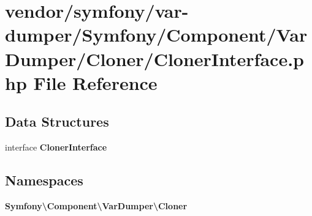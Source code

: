 \section{vendor/symfony/var-\/dumper/\+Symfony/\+Component/\+Var\+Dumper/\+Cloner/\+Cloner\+Interface.php File Reference}
\label{_cloner_interface_8php}
\subsection*{Data Structures}
\begin{DoxyCompactItemize}
\item 
interface {\bf Cloner\+Interface}
\end{DoxyCompactItemize}
\subsection*{Namespaces}
\begin{DoxyCompactItemize}
\item 
 {\bf Symfony\textbackslash{}\+Component\textbackslash{}\+Var\+Dumper\textbackslash{}\+Cloner}
\end{DoxyCompactItemize}
